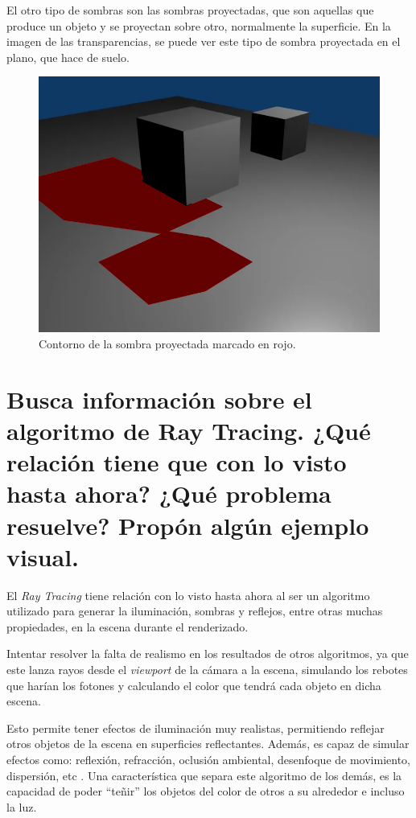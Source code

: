\documentclass{article}
\begin{document}
El otro tipo de sombras son las sombras proyectadas, que son aquellas que produce un objeto y se proyectan sobre otro, normalmente la superficie. En la imagen de las transparencias, se puede ver este tipo de sombra proyectada en el plano, que hace de suelo.

\begin{figure}[H]
    \centering
    \includegraphics[width=\textwidth]{imagenes/sombra0004proy.png}
    \caption{Contorno de la sombra proyectada marcado en rojo.}
 \end{figure}    

\section{Busca información sobre el algoritmo de Ray Tracing. ¿Qué relación tiene que con lo visto hasta ahora? ¿Qué problema resuelve? Propón algún ejemplo visual.}

El \textit{Ray Tracing} tiene relación con lo visto hasta ahora al ser un algoritmo utilizado para generar la iluminación, sombras y reflejos, entre otras muchas propiedades, en la escena durante el renderizado.

Intentar resolver la falta de realismo en los resultados de otros algoritmos, ya que este lanza rayos desde el \textit{viewport} de la cámara a la escena, simulando los rebotes que harían los fotones y calculando el color que tendrá cada objeto en dicha escena. 

Esto permite tener efectos de iluminación muy realistas, permitiendo reflejar otros objetos de la escena en superficies reflectantes. Además, es capaz de simular efectos como: reflexión, refracción, oclusión ambiental, desenfoque de movimiento, dispersión, etc \cite{raytracing}. Una característica que separa este algoritmo de los demás, es la capacidad de poder ``teñir'' los objetos del color de otros a su alrededor e incluso la luz.
\end{document}
